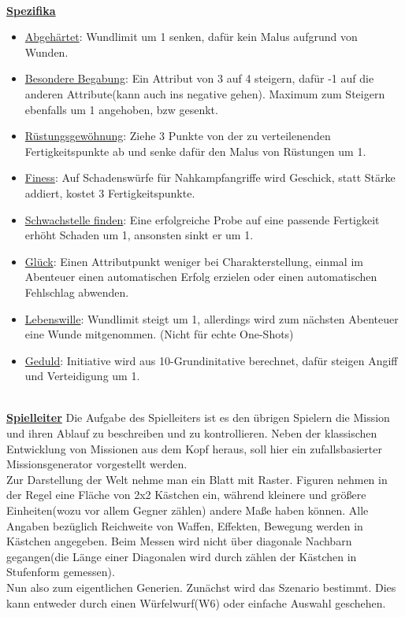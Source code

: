 \documentclass[twoside,a4paper]{minimal}
\begin{document}
\begin{multicols*}{3}
\textbf{\uline{\\Spezifika}}
\begin{itemize}
\item \uline{Abgehärtet}: Wundlimit um 1 senken, dafür kein Malus aufgrund von Wunden.
\item \uline{Besondere Begabung}: Ein Attribut von 3 auf 4 steigern, dafür -1 auf die anderen Attribute(kann auch ins negative gehen). Maximum zum Steigern ebenfalls um 1 angehoben, bzw gesenkt.
\item \uline{Rüstungsgewöhnung}: Ziehe 3 Punkte von der zu verteilenenden Fertigkeitspunkte ab und senke dafür den Malus von Rüstungen um 1.
\item \uline{Finess}: Auf Schadenswürfe für Nahkampfangriffe wird Geschick, statt Stärke addiert, kostet 3 Fertigkeitspunkte.
\item \uline{Schwachstelle finden}: Eine erfolgreiche Probe auf eine passende Fertigkeit erhöht Schaden um 1, ansonsten sinkt er um 1.
\item \uline{Glück}: Einen Attributpunkt weniger bei Charakterstellung, einmal im Abenteuer einen automatischen Erfolg erzielen oder einen automatischen Fehlschlag abwenden.
\item \uline{Lebenswille}: Wundlimit steigt um 1, allerdings wird zum nächsten Abenteuer eine Wunde mitgenommen. (Nicht für echte One-Shots)
\item \uline{Geduld}: Initiative wird aus 10-Grundinitative berechnet, dafür steigen Angiff und Verteidigung um 1. 
\end{itemize}
\textbf{\uline{\\Spielleiter}}
Die Aufgabe des Spielleiters ist es den übrigen Spielern die Mission und ihren Ablauf zu beschreiben und zu kontrollieren. Neben der klassischen Entwicklung von Missionen aus dem Kopf heraus, soll hier ein zufallsbasierter Missionsgenerator vorgestellt werden.
\\Zur Darstellung der Welt nehme man ein Blatt mit Raster. Figuren nehmen in der Regel eine Fläche von 2x2 Kästchen ein, während kleinere und größere Einheiten(wozu vor allem Gegner zählen) andere Maße haben können. Alle Angaben bezüglich Reichweite von Waffen, Effekten, Bewegung werden in Kästchen angegeben. Beim Messen wird nicht über diagonale Nachbarn gegangen(die Länge einer Diagonalen wird durch zählen der Kästchen in Stufenform gemessen).
\\Nun also zum eigentlichen Generien. Zunächst wird das Szenario bestimmt. Dies kann entweder durch einen Würfelwurf(W6) oder einfache Auswahl geschehen.

\end{multicols*}
\end{document}
